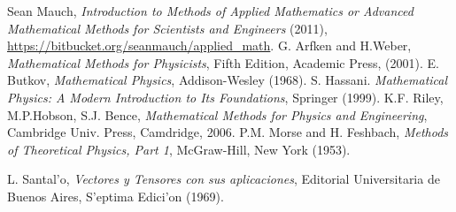 \begin{thebibliography}{99}
 Sean Mauch, {\em Introduction to Methods of Applied Mathematics                           or Advanced Mathematical Methods for Scientists and Engineers} (2011), \url{https://bitbucket.org/seanmauch/applied_math}.
 G. Arfken and H.Weber, {\em Mathematical Methods for Physicists}, Fifth Edition, Academic Press, (2001).
 E. Butkov, {\em Mathematical Physics}, Addison-Wesley (1968).
 S. Hassani. {\em Mathematical Physics: A Modern Introduction to Its Foundations}, Springer (1999).
 K.F. Riley, M.P.Hobson, S.J. Bence, \textit{Mathematical Methods for Physics and Engineering}, Cambridge Univ. Press, Camdridge, 2006.
 P.M. Morse and H. Feshbach, \textit{Methods of Theoretical Physics, Part 1}, McGraw-Hill, New York (1953).
\item L. Santal'o, {\em Vectores y Tensores con sus aplicaciones}, Editorial Universitaria de Buenos Aires, S'eptima Edici'on (1969).

\end{thebibliography}
